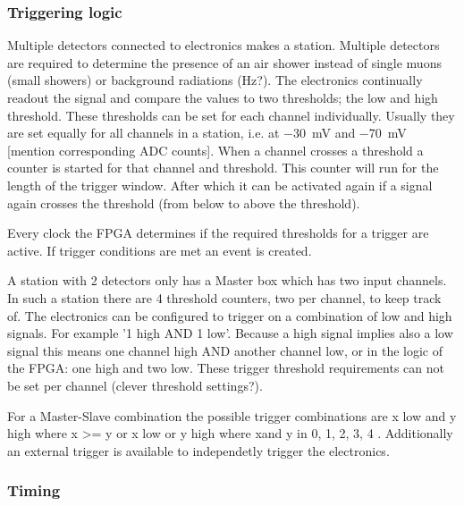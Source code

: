 \subsubsection{Triggering logic}

%
%
%


Multiple detectors connected to \hisparc electronics makes a station. Multiple detectors are required to determine the presence of an air shower instead of single muons (small showers) or background radiations (Hz?). The \hisparc electronics continually readout the signal and compare the \adc values to two thresholds; the low and high threshold. These thresholds can be set for each channel individually. Usually they are set equally for all channels in a station, i.e. at \SI{-30}{\milli\volt} and \SI{-70}{\milli\volt} [mention corresponding ADC counts]. When a channel crosses a threshold a counter is started for that channel and threshold. This counter will run for the length of the trigger window. After which it can be activated again if a signal again crosses the threshold (from below to above the threshold).

Every clock the FPGA determines if the required thresholds for a trigger are active. If trigger conditions are met an event is created.

A station with 2 detectors only has a Master box which has two input channels. In such a station there are 4 threshold counters, two per channel, to keep track of. The electronics can be configured to trigger on a combination of low and high signals. For example '1 high AND 1 low'. Because a high signal implies also a low signal this means one channel high AND another channel low, or in the logic of the FPGA: one high and two low. These trigger threshold requirements can not be set per channel (clever threshold settings?).

For a Master-Slave combination the possible trigger combinations are x low and y high where x >= y or x low or y high where xand y in 0, 1, 2, 3, 4 . Additionally an external trigger is available to independetly trigger the electronics.

\subsubsection{Timing}

